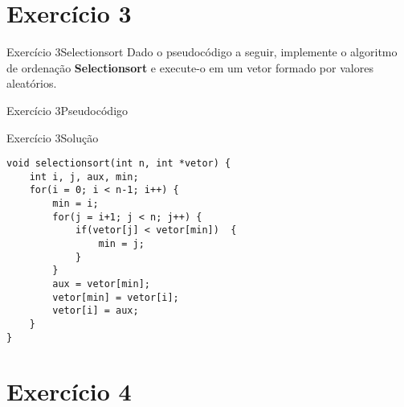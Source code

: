 \documentclass[aspectratio=169]{beamer}
\begin{document}
\section{Exercício 3}

\begin{frame}[fragile]{Exercício 3}{Selectionsort}
Dado o pseudocódigo a seguir, implemente o algoritmo de ordenação {\bf Selectionsort} e execute-o em um vetor formado por valores aleatórios.
\end{frame}


\begin{frame}[fragile]{Exercício 3}{Pseudocódigo}
\begin{algorithm}[H]
\caption{Selectionsort} 
\label{SelectionSort}
\end{algorithm}
\end{frame}

\begin{frame}[fragile]{Exercício 3}{Solução}
\begin{lstlisting}[style=CStyle]
void selectionsort(int n, int *vetor) {
    int i, j, aux, min;
    for(i = 0; i < n-1; i++) {
        min = i;
        for(j = i+1; j < n; j++) {
            if(vetor[j] < vetor[min])  {
                min = j;
            }
        }
        aux = vetor[min];
        vetor[min] = vetor[i];
        vetor[i] = aux;
    }
}
\end{lstlisting}
\end{frame}

\section{Exercício 4}
\end{document}
